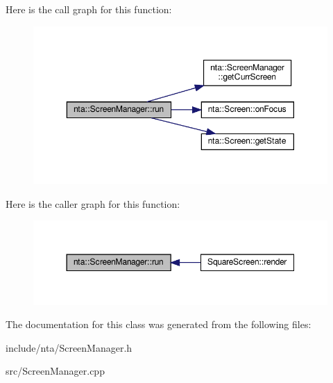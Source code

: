Here is the call graph for this function\+:\nopagebreak
\begin{figure}[H]
\begin{center}
\leavevmode
\includegraphics[width=350pt]{d0/dc4/classnta_1_1ScreenManager_ad20be92778255ff1527e84bb8e54abe3_cgraph}
\end{center}
\end{figure}
Here is the caller graph for this function\+:\nopagebreak
\begin{figure}[H]
\begin{center}
\leavevmode
\includegraphics[width=350pt]{d0/dc4/classnta_1_1ScreenManager_ad20be92778255ff1527e84bb8e54abe3_icgraph}
\end{center}
\end{figure}


The documentation for this class was generated from the following files\+:\begin{DoxyCompactItemize}
\item 
include/nta/Screen\+Manager.\+h\item 
src/Screen\+Manager.\+cpp\end{DoxyCompactItemize}

